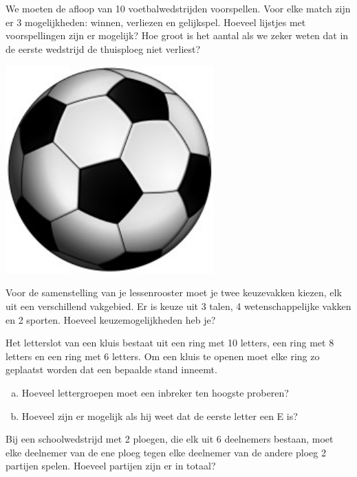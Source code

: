 \documentclass[12pt,twoside]{article}
\begin{document}
\begin{minipage}{0.7\textwidth}
\begin{oefening}
We moeten de afloop van 10 voetbalwedstrijden voorspellen. Voor elke match zijn er 3 mogelijkheden: winnen, verliezen en gelijkspel. Hoeveel lijstjes met voorspellingen zijn er mogelijk? Hoe groot is het aantal als we zeker weten dat in de eerste wedstrijd de thuisploeg niet verliest?
\end{oefening}
\end{minipage}
\begin{minipage}{0.25\textwidth}
\hfill
  \includegraphics[width=0.6\textwidth]{voetbal}
\end{minipage}

\begin{oefening}
Voor de samenstelling van je lessenrooster moet je twee keuzevakken kiezen, elk uit een verschillend vakgebied. Er is keuze uit 3 talen, 4 wetenschappelijke vakken en 2 sporten. Hoeveel keuzemogelijkheden heb je?
\end{oefening}

\begin{oefening}
Het letterslot van een kluis bestaat uit een ring met 10 letters, een ring met 8 letters en een ring met 6 letters. Om een kluis te openen moet elke ring zo geplaatst worden dat een bepaalde stand inneemt.
\begin{enumerate}[(a)]
  \item Hoeveel lettergroepen moet een inbreker ten hoogste proberen?
  \item Hoeveel zijn er mogelijk als hij weet dat de eerste letter een E is?
\end{enumerate}
\end{oefening}

\begin{oefening}
Bij een schoolwedstrijd met 2 ploegen, die elk uit 6 deelnemers bestaan, moet elke deelnemer van de ene ploeg tegen elke deelnemer van de andere ploeg 2 partijen spelen. Hoeveel partijen zijn er in totaal?
\end{oefening}
\end{document}
